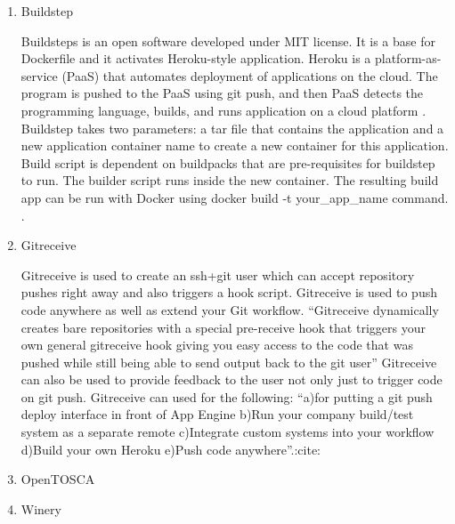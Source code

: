 \begin{enumerate}
\item {} 
Buildstep

Buildsteps is an open software developed under MIT license.
It is a base for Dockerfile and it activates Heroku-style
application. Heroku is a platform-as-service (PaaS) that
automates deployment of applications on the cloud. The
program is pushed to the PaaS using git push, and then
PaaS detects the programming language, builds, and runs
application on a cloud platform \label{\detokenize{i524/technologies:id604}}{\hyperref[\detokenize{i524/technologies:plassnig15}]{\sphinxcrossref{{[}522{]}}}}.
Buildstep takes two parameters: a tar file that contains
the application and a new application container name to
create a new container for this application. Build script
is dependent on buildpacks that are pre-requisites for
buildstep to run. The builder script runs inside the new
container.  The resulting build app can be run with Docker
using docker build -t your\_app\_name command.
\label{\detokenize{i524/technologies:id605}}{\hyperref[\detokenize{i524/technologies:github-buildstep}]{\sphinxcrossref{{[}523{]}}}}.

\item {} 
Gitreceive

Gitreceive is used to create an ssh+git user which can accept
repository pushes right away and also triggers a hook
script. Gitreceive is used to push code anywhere as well as
extend your Git workflow. ``Gitreceive dynamically creates bare
repositories with a special pre-receive hook that triggers your
own general gitreceive hook giving you easy access to the code
that was pushed while still being able to send output back to the
git user'' Gitreceive can also be used to provide feedback to the
user not only just to trigger code on git push.  Gitreceive can
used for the following: ``a)for putting a git push deploy
interface in front of App Engine b)Run your company build/test
system as a separate remote c)Integrate custom systems into your
workflow d)Build your own Heroku e)Push code
anywhere''.:cite:

\item {} 
OpenTOSCA

\item {} 
Winery


\end{enumerate}
